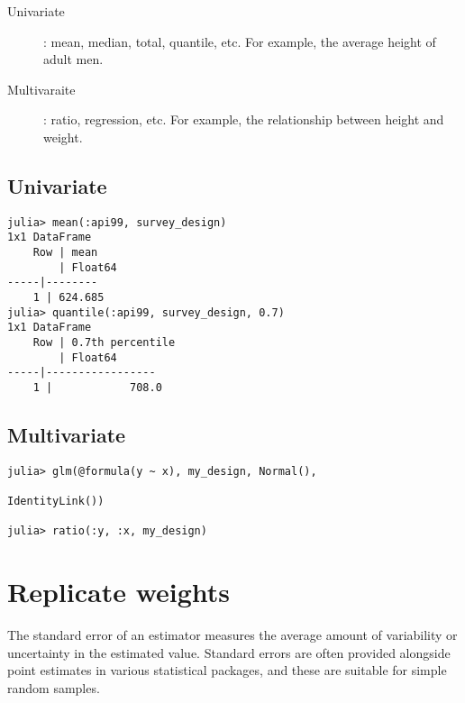 \documentclass{juliacon}
\begin{document}
\begin{description}
    \item[Univariate]: mean, median, total, quantile, etc. For example, the average height of adult men. 
    \item[Multivaraite]: ratio, regression, etc. For example, the relationship between height and weight. 
\end{description}

\subsection{Univariate}
\begin{lstlisting}
julia> mean(:api99, survey_design)
1x1 DataFrame
    Row | mean
        | Float64
-----|--------
    1 | 624.685
julia> quantile(:api99, survey_design, 0.7)
1x1 DataFrame
    Row | 0.7th percentile 
        | Float64          
-----|-----------------
    1 |            708.0
\end{lstlisting}

\subsection{Multivariate}
\begin{lstlisting}
julia> glm(@formula(y ~ x), my_design, Normal(),

IdentityLink())

julia> ratio(:y, :x, my_design)
\end{lstlisting}


\section{Replicate weights}

The standard error of an estimator measures the average amount of variability or uncertainty in the estimated value. Standard errors are often provided alongside point estimates in various statistical packages, and these are suitable for simple random samples.
\end{document}
